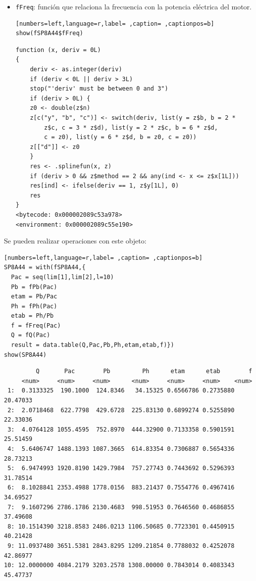 \begin{itemize}
\begin{itemize}
\item \texttt{fFreq}: función que relaciona la frecuencia con la potencia eléctrica del motor.
\begin{lstlisting}[numbers=left,language=r,label= ,caption= ,captionpos=b]
show(fSP8A44$fFreq)
\end{lstlisting}

\begin{verbatim}
function (x, deriv = 0L) 
{
    deriv <- as.integer(deriv)
    if (deriv < 0L || deriv > 3L) 
	stop("'deriv' must be between 0 and 3")
    if (deriv > 0L) {
	z0 <- double(z$n)
	z[c("y", "b", "c")] <- switch(deriv, list(y = z$b, b = 2 * 
	    z$c, c = 3 * z$d), list(y = 2 * z$c, b = 6 * z$d, 
	    c = z0), list(y = 6 * z$d, b = z0, c = z0))
	z[["d"]] <- z0
    }
    res <- .splinefun(x, z)
    if (deriv > 0 && z$method == 2 && any(ind <- x <= z$x[1L])) 
	res[ind] <- ifelse(deriv == 1, z$y[1L], 0)
    res
}
<bytecode: 0x000002089c53a978>
<environment: 0x000002089c55e190>
\end{verbatim}
\end{itemize}

Se pueden realizar operaciones con este objeto:
\begin{lstlisting}[numbers=left,language=r,label= ,caption= ,captionpos=b]
SP8A44 = with(fSP8A44,{
  Pac = seq(lim[1],lim[2],l=10)
  Pb = fPb(Pac)
  etam = Pb/Pac
  Ph = fPh(Pac)
  etab = Ph/Pb
  f = fFreq(Pac)
  Q = fQ(Pac)
  result = data.table(Q,Pac,Pb,Ph,etam,etab,f)})
show(SP8A44)
\end{lstlisting}

\begin{verbatim}
	     Q       Pac        Pb         Ph      etam      etab        f
	 <num>     <num>     <num>      <num>     <num>     <num>    <num>
 1:  0.3133325  190.1000  124.8346   34.15325 0.6566786 0.2735880 20.47033
 2:  2.0718468  622.7798  429.6728  225.83130 0.6899274 0.5255890 22.33036
 3:  4.0764128 1055.4595  752.8970  444.32900 0.7133358 0.5901591 25.51459
 4:  5.6406747 1488.1393 1087.3665  614.83354 0.7306887 0.5654336 28.73213
 5:  6.9474993 1920.8190 1429.7984  757.27743 0.7443692 0.5296393 31.78514
 6:  8.1028841 2353.4988 1778.0156  883.21437 0.7554776 0.4967416 34.69527
 7:  9.1607296 2786.1786 2130.4683  998.51953 0.7646560 0.4686855 37.49608
 8: 10.1514390 3218.8583 2486.0213 1106.50685 0.7723301 0.4450915 40.21428
 9: 11.0937480 3651.5381 2843.8295 1209.21854 0.7788032 0.4252078 42.86977
10: 12.0000000 4084.2179 3203.2578 1308.00000 0.7843014 0.4083343 45.47737
\end{verbatim}


\end{itemize}
